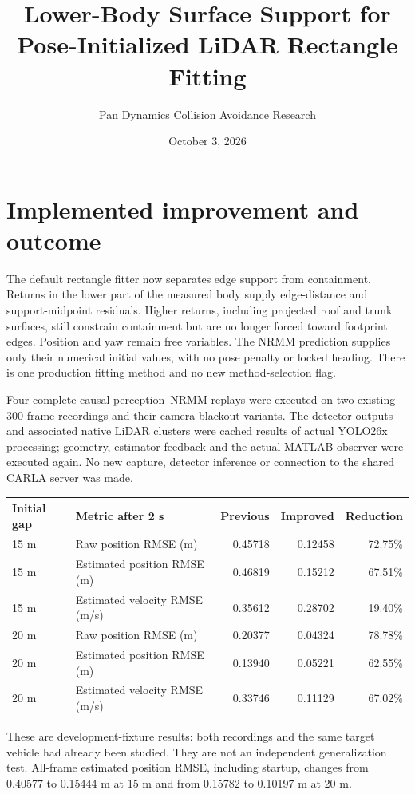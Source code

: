 \documentclass[11pt]{article}
\title{Lower-Body Surface Support for Pose-Initialized LiDAR Rectangle Fitting}
\author{Pan Dynamics Collision Avoidance Research}
\date{October 3, 2026}
\begin{document}
\maketitle

\section{Implemented improvement and outcome}
The default rectangle fitter now separates edge support from containment.
Returns in the lower part of the measured body supply edge-distance and
support-midpoint residuals. Higher returns, including projected roof and trunk
surfaces, still constrain containment but are no longer forced toward footprint
edges. Position and yaw remain free variables. The NRMM prediction supplies
only their numerical initial values, with no pose penalty or locked heading.
There is one production fitting method and no new method-selection flag.

Four complete causal perception--NRMM replays were executed on two existing
300-frame recordings and their camera-blackout variants. The detector outputs
and associated native LiDAR clusters were cached results of actual YOLO26x
processing; geometry, estimator feedback and the actual MATLAB observer were
executed again. No new capture, detector inference or connection to the shared
CARLA server was made.

\begin{center}\small
\begin{tabular}{@{}llrrr@{}}\toprule
Initial gap & Metric after 2 s & Previous & Improved & Reduction \\\midrule
15 m & Raw position RMSE (m) & 0.45718 & 0.12458 & 72.75\% \\
15 m & Estimated position RMSE (m) & 0.46819 & 0.15212 & 67.51\% \\
15 m & Estimated velocity RMSE (m/s) & 0.35612 & 0.28702 & 19.40\% \\
20 m & Raw position RMSE (m) & 0.20377 & 0.04324 & 78.78\% \\
20 m & Estimated position RMSE (m) & 0.13940 & 0.05221 & 62.55\% \\
20 m & Estimated velocity RMSE (m/s) & 0.33746 & 0.11129 & 67.02\% \\
\bottomrule\end{tabular}
\end{center}
These are development-fixture results: both recordings and the same target
vehicle had already been studied. They are not an independent generalization
test. All-frame estimated position RMSE, including startup, changes from
0.40577 to 0.15444 m at 15 m and from 0.15782 to 0.10197 m at 20 m.
\end{document}
